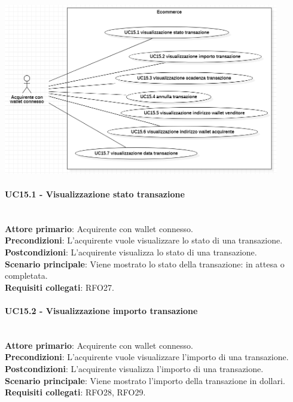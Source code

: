 \documentclass[a4paper, 12pt]{article}
\begin{document}
\includegraphics[width=0.9\textwidth]{UC_ECA3}

\paragraph{UC15.1 - Visualizzazione stato transazione}\\
\textbf{Attore primario}: Acquirente con wallet connesso.\\
\textbf{Precondizioni}: L'acquirente vuole visualizzare lo stato di una transazione.\\
\textbf{Postcondizioni}: L'acquirente visualizza lo stato di una transazione.\\
\textbf{Scenario principale}: Viene mostrato lo stato della transazione: in attesa o completata.\\
\textbf{Requisiti collegati}: RFO27.

\paragraph{UC15.2 - Visualizzazione importo transazione}\\
\textbf{Attore primario}: Acquirente con wallet connesso.\\
\textbf{Precondizioni}: L'acquirente vuole visualizzare l'importo di una transazione.\\
\textbf{Postcondizioni}: L'acquirente visualizza l'importo di una transazione.\\
\textbf{Scenario principale}: Viene mostrato l'importo della transazione in dollari.\\
\textbf{Requisiti collegati}: RFO28, RFO29.
\end{document}

